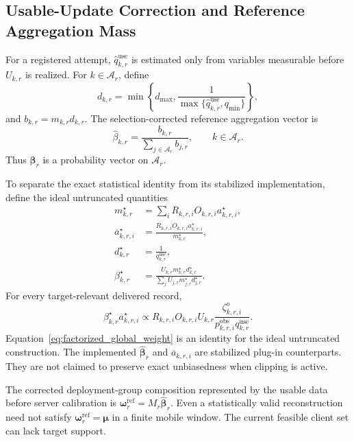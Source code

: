 \documentclass[letterpaper,journal]{IEEEtran}
\begin{document}
\subsection{Usable-Update Correction and Reference Aggregation Mass}
\label{subsec:usable_correction}

For a registered attempt, $\widehat q^{\mathrm{use}}_{k,r}$ is estimated only
from variables measurable before $U_{k,r}$ is realized.  For
$k\in\mathcal{A}_r$, define
\begin{equation}
 d_{k,r}
 =
 \min\!\left\{
 d_{\max},
 \frac{1}
 {\max\{\widehat q^{\mathrm{use}}_{k,r},q_{\min}\}}
 \right\},
 \label{eq:d_use}
\end{equation}
and $b_{k,r}=m_{k,r}d_{k,r}$.
The selection-corrected reference aggregation vector is
\begin{equation}
 \widehat\beta_{k,r}
 =
 \frac{b_{k,r}}
 {\sum_{j\in\mathcal{A}_r}b_{j,r}},
 \qquad
 k\in\mathcal{A}_r.
 \label{eq:beta_ref}
\end{equation}
Thus $\widehat{\boldsymbol\beta}_r$ is a probability vector on
$\mathcal{A}_r$.

To separate the exact statistical identity from its stabilized implementation,
define the ideal untruncated quantities
\begin{align*}
 m^\star_{k,r}
 &=
 \sum_i
 R_{k,r,i}O_{k,r,i}a^\star_{k,r,i},\\
 \overline a^\star_{k,r,i}
 &=
 \frac{
 R_{k,r,i}O_{k,r,i}a^\star_{k,r,i}
 }{m^\star_{k,r}},\\
 d^\star_{k,r}
 &=
 \frac{1}{q^{\mathrm{use}}_{k,r}},\\
 \beta^\star_{k,r}
 &=
 \frac{
 U_{k,r}m^\star_{k,r}d^\star_{k,r}
 }{
 \sum_j U_{j,r}m^\star_{j,r}d^\star_{j,r}
 }.
\end{align*}
For every target-relevant delivered record,
\begin{equation}
 \beta^\star_{k,r}\overline a^\star_{k,r,i}
 \propto
 R_{k,r,i}O_{k,r,i}U_{k,r}
 \frac{\zeta^{o}_{k,r,i}}
 {p^{\mathrm{obs}}_{k,r,i}q^{\mathrm{use}}_{k,r}}.
 \label{eq:factorized_global_weight}
\end{equation}
Equation~\eqref{eq:factorized_global_weight} is an identity for the
ideal untruncated construction.  The implemented
$\widehat{\boldsymbol\beta}_r$ and $\overline a_{k,r,i}$ are stabilized
plug-in counterparts.  They are not claimed to preserve exact
unbiasedness when clipping is active.

The corrected deployment-group composition represented by the usable
data before server calibration is
$\boldsymbol\omega_r^{\mathrm{ref}}=M_r\widehat{\boldsymbol\beta}_r$.
Even a statistically valid reconstruction need not satisfy
$\boldsymbol\omega_r^{\mathrm{ref}}=\boldsymbol\mu$ in a finite mobile
window.  The current feasible client set can lack target support.
\end{document}
